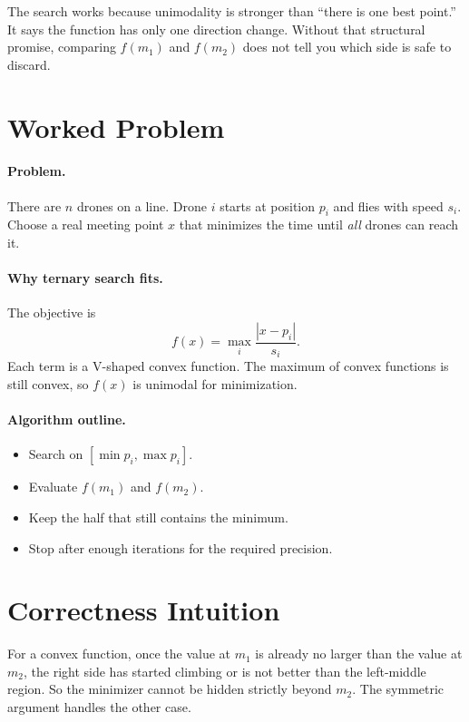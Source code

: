 The search works because unimodality is stronger than ``there is one best point.'' It says the function has only one
direction change. Without that structural promise, comparing \(f(m_1)\) and \(f(m_2)\) does not tell you which side is
safe to discard.

\section*{Worked Problem}

\paragraph{Problem.}
There are \(n\) drones on a line. Drone \(i\) starts at position \(p_i\) and flies with speed \(s_i\). Choose a real
meeting point \(x\) that minimizes the time until \emph{all} drones can reach it.

\paragraph{Why ternary search fits.}
The objective is
\[
f(x) = \max_i \frac{|x - p_i|}{s_i}.
\]
Each term is a V-shaped convex function. The maximum of convex functions is still convex, so \(f(x)\) is unimodal for
minimization.

\paragraph{Algorithm outline.}

\begin{itemize}
  \item Search on \([\min p_i, \max p_i]\).
  \item Evaluate \(f(m_1)\) and \(f(m_2)\).
  \item Keep the half that still contains the minimum.
  \item Stop after enough iterations for the required precision.
\end{itemize}

\section*{Correctness Intuition}

For a convex function, once the value at \(m_1\) is already no larger than the value at \(m_2\), the right side has
started climbing or is not better than the left-middle region. So the minimizer cannot be hidden strictly beyond
\(m_2\). The symmetric argument handles the other case.

